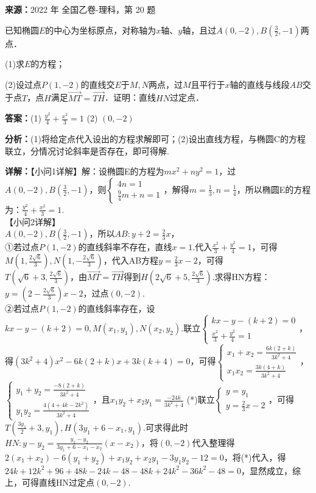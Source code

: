 \begin{question}[points=12]
\textbf{来源：}2022 年 全国乙卷-理科，第 20 题\par
已知椭圆$E$的中心为坐标原点，对称轴为$x$轴、$y$轴，且过$A(0,-2), B\left(\frac{3}{2},-1\right)$两点．

(1)求$E$的方程；

(2)设过点$P(1,-2)$的直线交$E$于$M,N$两点，过$M$且平行于$x$轴的直线与线段$AB$交于点$T$，点$H$满足$\overrightarrow{MT}=\overrightarrow{TH}$．证明：直线$HN$过定点．
\begin{solution}
\textbf{答案：}(1) $\frac{y^2}{4}+\frac{x^2}{3}=1$
(2) $(0,-2)$

\textbf{分析：}(1)将给定点代入设出的方程求解即可；(2)设出直线方程，与椭圆C的方程联立，分情况讨论斜率是否存在，即可得解.

\textbf{详解：}【小问1详解】解：设椭圆E的方程为$mx^2+ny^2=1$，过$A(0,-2), B\left(\frac{3}{2},-1\right)$，则$\begin{cases} 4n=1 \\ \frac{9}{4}m+n=1 \end{cases}$，解得$m=\frac{1}{3}, n=\frac{1}{4}$，所以椭圆E的方程为：$\frac{y^2}{4}+\frac{x^2}{3}=1$.\\【小问2详解】\\$A(0,-2), B(\frac{3}{2},-1)$，所以$AB: y+2 = \frac{2}{3}x$，\\①若过点$P(1,-2)$的直线斜率不存在，直线$x=1$.代入$\frac{x^2}{3}+\frac{y^2}{4}=1$，可得$M\left(1,\frac{2\sqrt{6}}{3}\right), N\left(1,-\frac{2\sqrt{6}}{3}\right)$，代入AB方程$y=\frac{2}{3}x-2$，可得\\$T\left(\sqrt{6}+3,\frac{2\sqrt{6}}{3}\right)$，由$\overrightarrow{MT}=\overrightarrow{TH}$得到$H\left(2\sqrt{6}+5,\frac{2\sqrt{6}}{3}\right)$.求得HN方程：$y=\left(2-\frac{2\sqrt{6}}{3}\right)x-2$，过点$(0,-2)$.\\②若过点$P(1,-2)$的直线斜率存在，设$kx-y-(k+2)=0, M(x_1,y_1), N(x_2,y_2)$.联立$\begin{cases} kx-y-(k+2)=0 \\ \frac{x^2}{3}+\frac{y^2}{4}=1 \end{cases}$，得$(3k^2+4)x^2 - 6k(2+k)x + 3k(k+4)=0$，可得$\begin{cases} x_1+x_2 = \frac{6k(2+k)}{3k^2+4} \\ x_1x_2 = \frac{3k(4+k)}{3k^2+4} \end{cases}$，$\begin{cases} y_1+y_2 = \frac{-8(2+k)}{3k^2+4} \\ y_1y_2 = \frac{4(4+4k-2k^2)}{3k^2+4} \end{cases}$，且$x_1y_2+x_2y_1 = \frac{-24k}{3k^2+4}$ (*)联立$\begin{cases} y=y_1 \\ y=\frac{2}{3}x-2 \end{cases}$，可得$T\left(\frac{3y_1}{2}+3, y_1\right), H(3y_1+6-x_1, y_1)$.可求得此时$HN: y-y_2 = \frac{y_1-y_2}{3y_1+6-x_1-x_2}(x-x_2)$，将$(0,-2)$代入整理得$2(x_1+x_2)-6(y_1+y_2)+x_1y_2+x_2y_1-3y_1y_2-12=0$，将(*)代入，得$24k+12k^2+96+48k-24k-48-48k+24k^2-36k^2-48=0$，显然成立，综上，可得直线HN过定点$(0,-2)$.
\end{solution}
\end{question}

